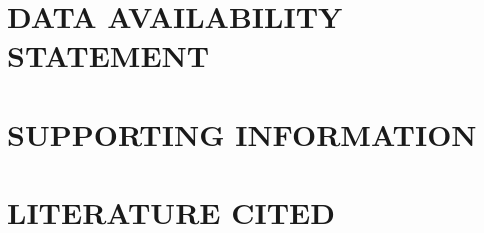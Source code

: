 \documentclass[
]{article}
\begin{document}
\hypertarget{data-availability-statement}{%
\section{DATA AVAILABILITY
STATEMENT}\label{data-availability-statement}}

\hypertarget{supporting-information}{%
\section{SUPPORTING INFORMATION}\label{supporting-information}}

\hypertarget{literature-cited}{%
\section{LITERATURE CITED}\label{literature-cited}}
\end{document}
